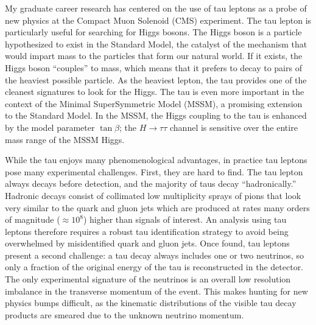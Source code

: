 \documentclass{scrartcl}        %
\date{}
\newcommand{\Sep}{\vspace{2em}}
\begin{document}
\thispagestyle{empty}
\begin{cv}{}
\Sep




My graduate career research has centered on the use of tau leptons as
a probe of new physics at the Compact Muon Solenoid (CMS) experiment.  The tau
lepton is particularly useful for searching for Higgs bosons.  The Higgs boson
is a particle hypothesized to exist in the Standard Model,
 the catalyst of the mechanism that would impart mass to the
particles that form our natural world.  If it exists, the Higgs boson
``couples'' to mass, which means that it prefers to decay to pairs of the
heaviest possible particle.  As the heaviest
lepton, the tau provides one of the cleanest signatures to look for the Higgs.  The
tau is even more important in the context of the Minimal SuperSymmetric Model
(MSSM), a promising extension to the Standard Model.  In the
MSSM, the Higgs coupling to the tau is enhanced by the model parameter
$\tan\beta$; the $H\to\tau\tau$ channel is sensitive over the entire mass range
of the MSSM Higgs. 

While the tau enjoys many phenomenological advantages, in practice tau leptons
pose many experimental challenges.  First, they are hard to find.  The tau
lepton always decays before detection, and the
majority of taus decay ``hadronically.'' Hadronic decays consist of collimated
low multiplicity sprays of pions that look very similar to
the quark and gluon jets which are produced at rates many orders of magnitude
($\approx 10^8$) higher than signals of interest.  An analysis using tau leptons
therefore requires a robust tau identification strategy to avoid being
overwhelmed by misidentified quark and gluon jets.  Once found, tau leptons
present a second challenge: a tau decay always includes one or two neutrinos, so
only a fraction of the original energy of the tau is reconstructed in the
detector.  The only experimental signature of the neutrinos is an overall low
resolution imbalance in the transverse momentum of the event.  This makes
hunting for new physics bumps difficult, as the kinematic distributions of the
visible tau decay products are smeared due to the unknown neutrino momentum.


\end{cv}
\end{document}
